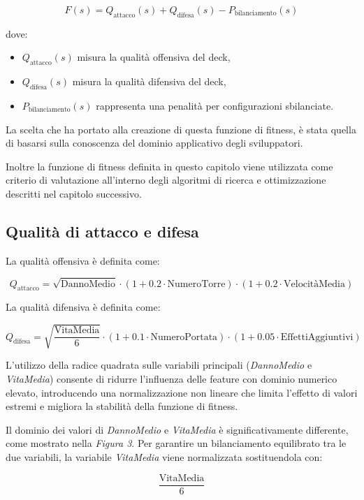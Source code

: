 \documentclass{article}
\begin{document}
\[
F(s) = Q_{\text{attacco}}(s) + Q_{\text{difesa}}(s) - P_{\text{bilanciamento}}(s)
\]

dove:
\begin{itemize}
    \item $Q_{\text{attacco}}(s)$ misura la qualità offensiva del deck,
    \item $Q_{\text{difesa}}(s)$ misura la qualità difensiva del deck,
    \item $P_{\text{bilanciamento}}(s)$ rappresenta una penalità per configurazioni sbilanciate.
\end{itemize}

La scelta che ha portato alla creazione di questa funzione di fitness, è stata quella di basarsi sulla conoscenza del dominio applicativo degli sviluppatori.

Inoltre la funzione di fitness definita in questo capitolo viene utilizzata come criterio di valutazione all’interno degli algoritmi di ricerca e ottimizzazione descritti nel capitolo successivo.

\subsection{Qualità di attacco e difesa}

La qualità offensiva è definita come:

\[
Q_{\text{attacco}} = \sqrt{\text{DannoMedio}} \cdot (1 + 0.2 \cdot \text{NumeroTorre}) \cdot (1 + 0.2 \cdot \text{VelocitàMedia})
\]

La qualità difensiva è definita come:

\[
Q_{\text{difesa}} = \sqrt{\frac{\text{VitaMedia}}{6}} \cdot (1 + 0.1 \cdot \text{NumeroPortata}) \cdot (1 + 0.05 \cdot \text{EffettiAggiuntivi})
\]

L’utilizzo della radice quadrata sulle variabili principali (\textit{DannoMedio} e \textit{VitaMedia}) consente di ridurre l’influenza delle feature con dominio numerico elevato, introducendo una normalizzazione non lineare che limita l’effetto di valori estremi e migliora la stabilità della funzione di fitness.

\medskip
Il dominio dei valori di \textit{DannoMedio} e \textit{VitaMedia} è significativamente differente, come mostrato nella \textit{Figura 3}. 
Per garantire un bilanciamento equilibrato tra le due variabili, la variabile \textit{VitaMedia} viene normalizzata sostituendola con:

\[
\frac{\text{VitaMedia}}{6}
\]
\end{document}
